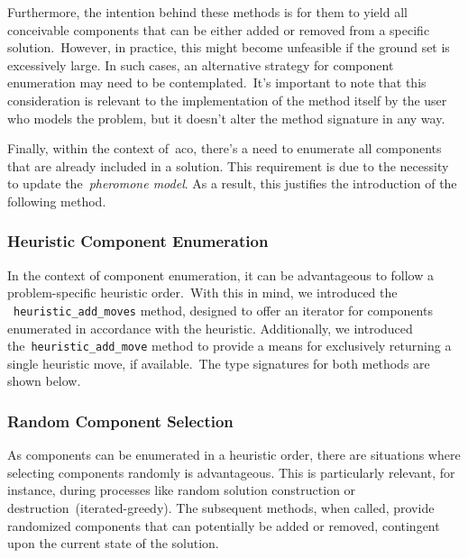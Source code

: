 Furthermore, the intention behind these methods is for them to yield all
conceivable components that can be either added or removed from a specific
solution.~However, in practice, this might become unfeasible if the ground set
is excessively large. In such cases, an alternative strategy for component
enumeration may need to be contemplated.~It's important to note that this
consideration is relevant to the implementation of the method itself by the user
who models the problem, but it doesn't alter the method signature in any way.


Finally, within the context of~\acrshort{aco}, there's a need to enumerate all
components that are already included in a solution. This requirement is due to
the necessity to update the~\textit{pheromone model}. As a result, this
justifies the introduction of the following method.

\begin{center}
\end{center}

\subsubsection*{Heuristic Component Enumeration}

In the context of component enumeration, it can be advantageous to follow a
problem-specific heuristic order.~With this in mind, we introduced the
~\texttt{heuristic\_add\_moves} method, designed to offer an iterator for
components enumerated in accordance with the heuristic. Additionally, we
introduced the~\texttt{heuristic\_add\_move} method to provide a means for
exclusively returning a single heuristic move, if available.~The type signatures
for both methods are shown below.

\begin{center}

\end{center}

\subsubsection*{Random Component Selection}

As components can be enumerated in a heuristic order, there are situations where
selecting components randomly is advantageous. This is particularly relevant,
for instance, during processes like random solution construction or
destruction~(\acrshort{iterated-greedy}). The subsequent methods, when called,
provide randomized components that can potentially be added or removed,
contingent upon the current state of the solution.

